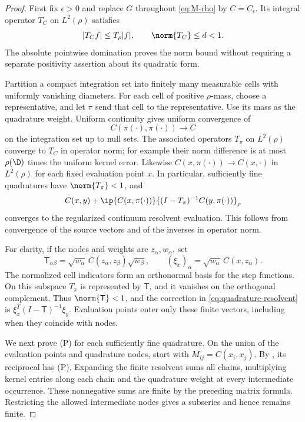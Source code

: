 \begin{proof}
First fix $\epsilon>0$ and replace $G$ throughout \eqref{eq:M-rho} by $C=C_\epsilon$. Its integral operator $T_C$ on $L^2(\rho)$ satisfies
\[
|T_Cf|\le T_\rho|f|,\qquad \norm{T_C}\le d<1.
\]
The absolute pointwise domination proves the norm bound without requiring a separate positivity assertion about its quadratic form.

Partition a compact integration set into finitely many measurable cells with uniformly vanishing diameters. For each cell of positive $\rho$-mass, choose a representative, and let $\pi$ send that cell to the representative. Use its mass as the quadrature weight. Uniform continuity gives uniform convergence of
\[
C(\pi(\cdot),\pi(\cdot))\longrightarrow C
\]
on the integration set up to null sets. The associated operators $T_\pi$ on $L^2(\rho)$ converge to $T_C$ in operator norm; for example their norm difference is at most $\rho(\D)$ times the uniform kernel error. Likewise $C(x,\pi(\cdot))\to C(x,\cdot)$ in $L^2(\rho)$ for each fixed evaluation point $x$. In particular, sufficiently fine quadratures have $\norm{T_\pi}<1$, and
\begin{equation}\label{eq:quadrature-resolvent}
C(x,y)+\ip{C(x,\pi(\cdot))}{(I-T_\pi)^{-1}C(y,\pi(\cdot))}_\rho
\end{equation}
converges to the regularized continuum resolvent evaluation. This follows from convergence of the source vectors and of the inverses in operator norm.

For clarity, if the nodes and weights are $z_\alpha,w_\alpha$, set
\[
\mathsf T_{\alpha\beta}
=\sqrt{w_\alpha}\,C(z_\alpha,z_\beta)\sqrt{w_\beta},
\qquad
(\xi_x)_\alpha=\sqrt{w_\alpha}\,C(x,z_\alpha).
\]
The normalized cell indicators form an orthonormal basis for the step functions. On this subspace $T_\pi$ is represented by $\mathsf T$, and it vanishes on the orthogonal complement. Thus $\norm{\mathsf T}<1$, and the correction in \eqref{eq:quadrature-resolvent} is $\xi_x^T(I-\mathsf T)^{-1}\xi_y$. Evaluation points enter only these finite vectors, including when they coincide with nodes.

We next prove \textup{(P)} for each sufficiently fine quadrature. On the union of the evaluation points and quadrature nodes, start with $M_{ij}=C(x_i,x_j)$. By , its reciprocal has \textup{(P)}. Expanding the finite resolvent sums all chains, multiplying kernel entries along each chain and the quadrature weight at every intermediate occurrence. These nonnegative sums are finite by the preceding matrix formula. Restricting the allowed intermediate nodes gives a subseries and hence remains finite.


\end{proof}
